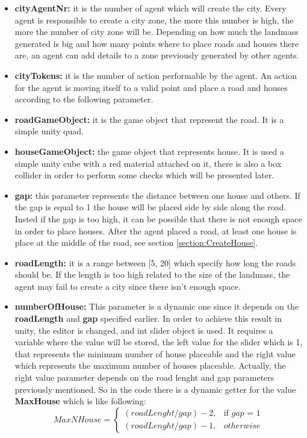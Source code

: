 \documentclass[12pt]{article}
\begin{document}
    \begin{itemize}
        \item \textbf{cityAgentNr:} it is the number of agent which will create the city. Every agent is responsible to create a city zone, the more this 
        number is high, the more the number of city zone will be. Depending on how much the landmass generated is big and how many points where to place roads
        and houses there are, an agent can add details to a zone previously generated by other agents.
        \item \textbf{cityTokens:} it is the number of action performable by the agent. An action for the agent is moving itself to a valid point and place a road 
        and houses according to the following parameter.
        \item \textbf{roadGameObject:} it is the game object that represent the road. It is a simple unity quad.
        \item \textbf{houseGameObject:} the game object that represents house. It is used a simple unity cube with a red material attached on it, there is also a box collider
        in order to perform some checks which will be presented later.
        \item \textbf{gap:} this parameter represents the distance between one house and others. If the gap is equal to 1 the house will be placed side by side
        along the road. Insted if the gap is too high, it can be possible that there is not enough space in order to place houses. After the agent placed a road,
        at least one house is place at the middle of the road, see section \ref{section:CreateHouse}. 
        \item \textbf{roadLength:} it is a range between [5, 20] which specify how long the roads should be. If the length is too high related to the size of the landmass,
        the agent may fail to create a city since there isn't enough space. 
        \item \textbf{numberOfHouse:} This parameter is a dynamic one since it depends on the \textbf{roadLength} and \textbf{gap} specified earlier. In order to achieve this result in unity,
        the editor is changed, and int slider object is used. It requires a variable where the value will be stored, the left value for the slider which is 1, that
        represents the minimum number of house placeable and the right value which represents the maximum number of houses placeable. Actually, the right value parameter depends on
        the road lenght and gap parameters previously mentioned. So in the code there is a dynamic getter for the value \textbf{MaxHouse} which is like following:
        \begin{equation}
            MaxNHouse = \begin{cases} (roadLenght/gap) - 2, & \mbox{if } gap\mbox{ = 1} \\ (roadLenght/gap) - 1, & \mbox{} otherwise\  \end{cases}
        \end{equation}


\end{itemize}
\end{document}
